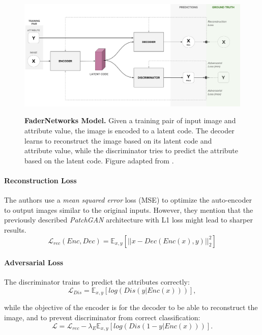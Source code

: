 \documentclass[12pt]{report}
\begin{document}
\begin{figure}[h]
\centering
{\includegraphics[width=\linewidth]{03_analysis/gans/fader}}
\caption{\label{fig:fader_model} \textbf{FaderNetworks Model.} Given a training pair of input image and attribute value, the image is encoded to a latent code. The decoder learns to reconstruct the image based on its latent code and attribute value, while the discriminator tries to predict the attribute based on the latent code. Figure adapted from \cite{lample_fader_2017}.}
\end{figure}


\paragraph{Reconstruction Loss}
The authors use a \textit{mean squared error} loss (MSE) to optimize the auto-encoder to output images similar to the original inputs. However, they mention that the previously described \textit{PatchGAN} architecture with L1 loss might lead to sharper results.
\begin{equation}
\mathcal{L}_{rec}(Enc,Dec) = \mathbb{E}_{x,y}[||x-Dec(Enc(x),y)||^2_2]
\end{equation}

\paragraph{Adversarial Loss}
The discriminator trains to predict the attributes correctly:
\begin{equation}
\mathcal{L}_{Dis} = \mathbb{E}_{x,y}[log(Dis(y|Enc(x)))],
\end{equation}

while the objective of the encoder is for the decoder to be able to reconstruct the image, and to prevent discriminator from correct classification:
\begin{equation}
\mathcal{L} = \mathcal{L}_{rec} - \lambda_E \mathbb{E}_{x,y}[log(Dis(1-y|Enc(x)))].
\end{equation}
\end{document}
